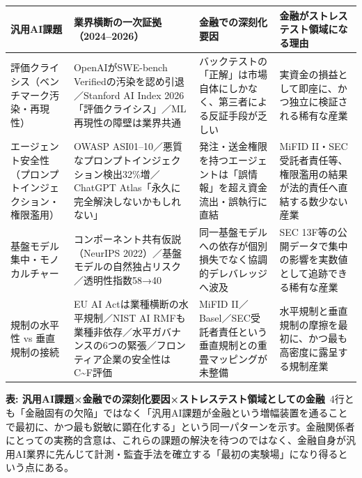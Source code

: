 \begin{center}
\footnotesize
\renewcommand{\arraystretch}{1.35}
\begin{tabular}{@{}p{2.6cm}p{4.4cm}p{3.9cm}p{3.3cm}@{}}
\toprule
\textbf{汎用AI課題} & \textbf{業界横断の一次証拠（2024--2026）} & \textbf{金融での深刻化要因} & \textbf{金融がストレステスト領域になる理由} \\
\midrule
評価クライシス（ベンチマーク汚染・再現性） & OpenAIがSWE-bench Verifiedの汚染を認め引退\cite{y07swebenchcontam2026}／Stanford AI Index 2026「評価クライシス」\cite{y07aiindex2026}／ML再現性の障壁は業界共通\cite{y07mlreproducibility2024} & バックテストの「正解」は市場自体にしかなく、第三者による反証手段が乏しい & 実資金の損益として即座に、かつ独立に検証される稀有な産業 \\
\addlinespace
エージェント安全性（プロンプトインジェクション・権限濫用） & OWASP ASI01--10\cite{y07owaspagentic2026}／悪質なプロンプトインジェクション検出32\%増\cite{y07googlepromptinjection2026}／ChatGPT Atlas「永久に完全解決しないかもしれない」\cite{y07openaiatlas2025} & 発注・送金権限を持つエージェントは「誤情報」を超え資金流出・誤執行に直結 & MiFID II・SEC受託者責任等、権限濫用の結果が法的責任へ直結する数少ない産業 \\
\addlinespace
基盤モデル集中・モノカルチャー & コンポーネント共有仮説（NeurIPS 2022）\cite{y07monoculture2022}／基盤モデルの自然独占リスク\cite{y07foundationconcentration2023}／透明性指数58→40\cite{y07aiindex2026} & 同一基盤モデルへの依存が個別損失でなく協調的デレバレッジへ波及\cite{x07homogeneity2026} & SEC 13F等の公開データで集中の影響を実数値として追跡できる稀有な産業 \\
\addlinespace
規制の水平性 vs 垂直規制の接続 & EU AI Actは業種横断の水平規制\cite{y07euaiacthorizontal}／NIST AI RMFも業種非依存\cite{y07nistairmf2023}／水平ガバナンスの6つの緊張\cite{y07govopacity2026}／フロンティア企業の安全性はC\textasciitilde{}F評価\cite{y07flisafetyindex2025} & MiFID II／Basel／SEC受託者責任という垂直規制との重畳マッピングが未整備 & 水平規制と垂直規制の摩擦を最初に、かつ最も高密度に露呈する規制産業 \\
\bottomrule
\end{tabular}
\end{center}
{\small\color{brandgray}\textbf{表: 汎用AI課題×金融での深刻化要因×ストレステスト領域としての金融}\ 4行とも「金融固有の欠陥」ではなく「汎用AI課題が金融という増幅装置を通ることで最初に、かつ最も鋭敏に顕在化する」という同一パターンを示す。金融関係者にとっての実務的含意は、これらの課題の解決を待つのではなく、金融自身が汎用AI業界に先んじて計測・監査手法を確立する「最初の実験場」になり得るという点にある。}
